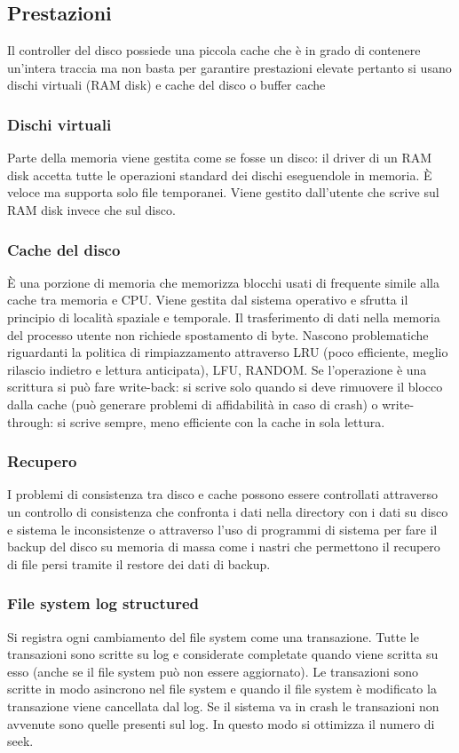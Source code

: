 \subsection{Prestazioni}
Il controller del disco possiede una piccola cache che \`e in grado di contenere un'intera traccia ma non basta per garantire prestazioni elevate pertanto si usano dischi virtuali (RAM
disk) e cache del disco o buffer cache
\subsubsection{Dischi virtuali}
Parte della memoria viene gestita come se fosse un disco: il driver di un RAM disk accetta tutte le operazioni standard dei dischi eseguendole in memoria. \`E veloce ma supporta solo
file temporanei. Viene gestito dall'utente che scrive sul RAM disk invece che sul disco. 
\subsubsection{Cache del disco}
\`E una porzione di memoria che memorizza blocchi usati di frequente simile alla cache tra memoria e CPU. Viene gestita dal sistema operativo e sfrutta il principio di localit\`a
spaziale e temporale. Il trasferimento di dati nella memoria del processo utente non richiede spostamento di byte. Nascono problematiche riguardanti la politica di rimpiazzamento
attraverso LRU (poco efficiente, meglio rilascio indietro e lettura anticipata), LFU, RANDOM. Se l'operazione \`e una scrittura si pu\`o fare write-back: si scrive solo quando si 
deve rimuovere il blocco dalla cache (pu\`o generare problemi di affidabilit\`a in caso di crash) o write-through: si scrive sempre, meno efficiente con la cache in sola lettura. 
\subsubsection{Recupero}
I problemi di consistenza tra disco e cache possono essere controllati attraverso un controllo di consistenza che confronta i dati nella directory con i dati su disco e sistema le
inconsistenze o attraverso l'uso di programmi di sistema per fare il backup del disco su memoria di massa come i nastri che permettono il recupero di file persi tramite il restore
dei dati di backup. 
\subsubsection{File system log structured}
Si registra ogni cambiamento del file system come una transazione. Tutte le transazioni sono scritte su log e considerate completate quando viene scritta su esso (anche se il file
system pu\`o non essere aggiornato). Le transazioni sono scritte in modo asincrono nel file system e quando il file system \`e modificato la transazione viene cancellata dal log. Se
il sistema va in crash le transazioni non avvenute sono quelle presenti sul log. In questo modo si ottimizza il numero di seek. 
